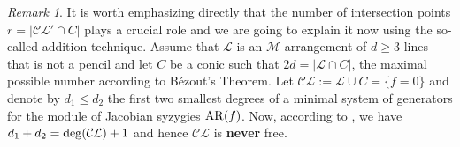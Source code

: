 \documentclass[11pt]{article}
\theoremstyle{plain}
\newtheorem{proposition}[theorem]{Proposition}
\theoremstyle{definition}
\theoremstyle{remark}
\newtheorem{remark}[theorem]{Remark}
\begin{document}
\begin{remark}
It is worth emphasizing directly that the number of intersection points $r = |\mathcal{CL}' \cap C|$ plays a crucial role and we are going to explain it now using the so-called addition technique. Assume that $\mathcal{L}$ is an $\mathscr{M}$-arrangement of $d\geq 3$ lines that is not a pencil and let $C$ be a conic such that $2d = |\mathcal{L}\cap C|$, the maximal possible number according to B\'ezout's Theorem. Let $\mathcal{CL} := \mathcal{L}\cup C = \{f=0\}$ and denote by $d_1\leq  d_{2}$ the first two smallest degrees of a minimal system of generators for the module of Jacobian syzygies ${\rm AR}(f)$. Now, according to \cite[Theorem 1.6]{ADP}, we have  $d_{1}+d_{2} = {\rm deg}(\mathcal{CL})+1$ and hence $\mathcal{CL}$ is \textbf{never} free.
\end{remark}
\end{document}
